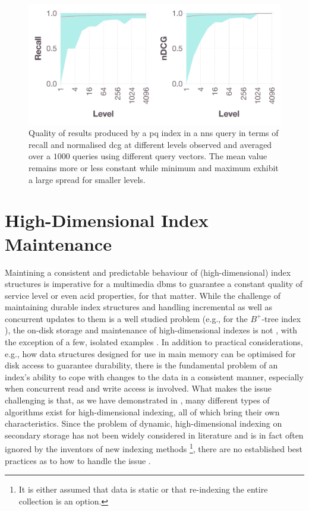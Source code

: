 \begin{figure}
    \centering
    \includegraphics[width=\textwidth]{figures/index-quality-pq}
    \caption{Quality of results produced by a \acrshort{pq} index in a \acrshort{nns} query in terms of recall and normalised \acrshort{dcg} at different levels observed and averaged over a $1000$ queries using different query vectors. The mean value remains more or less constant while minimum and maximum exhibit a large spread for smaller levels.}
    \label{figure:index_quality}
\end{figure}

\section{High-Dimensional Index Maintenance}
\label{section:hd_index_maintenance}

Maintining a consistent and predictable behaviour of (high-dimensional) index structures is imperative for a multimedia \acrshort{dbms} to guarantee a constant quality of service level or even \acrshort{acid} properties, for that matter. While the challenge of maintaining durable index structures and handling incremental as well as concurrent updates to them is a well studied problem (e.g., for the $B^{+}$-tree index \cite{Garcia:2009Database,Petrov:2019Database}), the on-disk storage and maintenance of high-dimensional indexes is not \cite{Amsaleg:2014Database}, with the exception of a few, isolated examples \cite{Olafsson:2011Dynamic,Hojsgaard:2019Index,Jayaram:2019DiskANN,Lu:2020VHP}. In addition to practical considerations, e.g., how data structures designed for use in main memory can be optimised for disk access to guarantee durability, there is the fundamental problem of an index's ability to cope with changes to the data in a consistent manner, especially when concurrent read and write access is involved. What makes the issue challenging is that, as we have demonstrated in , many different types of algorithms exist for high-dimensional indexing, all of which bring their own characteristics. Since the problem of dynamic, high-dimensional indexing on secondary storage has not been widely considered in literature and is in fact often ignored by the inventors of new indexing methods \footnote{It is either assumed that data is static or that re-indexing the entire collection is an option.}, there are no established best practices as to how to handle the issue \cite{Olafsson:2011Dynamic,Amsaleg:2014Database}.


